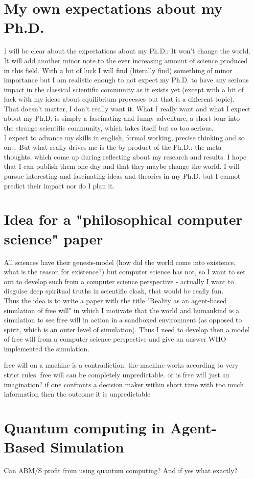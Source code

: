 \documentclass{article}
\begin{document}
\section{My own expectations about my Ph.D.}
I will be clear about the expectations about my Ph.D.: It won't change the world. It will add another minor note to the ever increasing amount of science produced in this field. With a bit of luck I will find (literally find) something of minor importance but I am realistic enough to not expect my Ph.D. to have any serious impact in the classical scientific community as it exists yet (except with a bit of luck with my ideas about equilibrium processes but that is a different topic). That doesn't matter, I don't really want it. What I really want and what I expect about my Ph.D. is simply a fascinating and funny adventure, a short tour into the strange scientific community, which takes itself but so too serious. \\
I expect to advance my skills in english, formal working, precise thinking and so on... But what really drives me is the by-product of the Ph.D.: the meta-thoughts, which come up during reflecting about my research and results. I hope that I can publish them one day and that they maybe change the world. I will pursue interesting and fascinating ideas and theories in my Ph.D. but I cannot predict their impact nor do I plan it.

\section{Idea for a "philosophical computer science" paper}
All sciences have their genesis-model (how did the world come into existence, what is the reason for existence?) but computer science has not, so I want to set out to develop such from a computer science perspective - actually I want to disguise deep spiritual truths in scientific cloak, that would be really fun. \\
Thus the idea is to write a paper with the title "Reality as an agent-based simulation of free will" in which I motivate that the world and humankind is a simulation to see free will in action in a sandboxed environment (as opposed to spirit, which is an outer level of simulation). Thus I need to develop then a model of free will from a computer science perspective and give an answer WHO implemented the simulation.

free will on a machine is a contradiction. the machine works according to very strict rules. free will can be completely unpredictable. or is free will just an imagination? if one confronts a decision maker within short time with too much information then the outcome it is unpredictable 

\section{Quantum computing in Agent-Based Simulation}
Can ABM/S profit from using quantum computing? And if yes what exactly?
\end{document}
